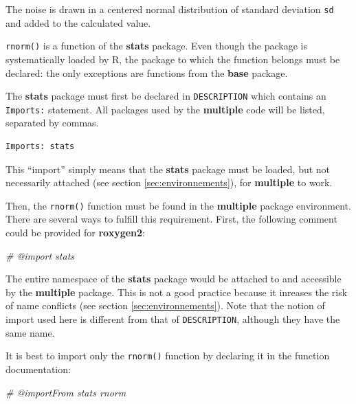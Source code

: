 \documentclass[
  12pt,
  american,
  a4paper,
  extrafontsizes,onecolumn,openright
  ]{memoir}
\newenvironment{Shaded}{\begin{snugshade}}{\end{snugshade}}
\newcommand{\CommentTok}[1]{\textcolor[rgb]{0.56,0.35,0.01}{\textit{#1}}}
\begin{document}
\normalsize
The noise is drawn in a centered normal distribution of standard deviation \texttt{sd} and added to the calculated value.

\texttt{rnorm()} is a function of the \textbf{stats} package.
Even though the package is systematically loaded by R, the package to which the function belongs must be declared: the only exceptions are functions from the \textbf{base} package.

The \textbf{stats} package must first be declared in \texttt{DESCRIPTION} which contains an \texttt{Imports:} statement.
All packages used by the \textbf{multiple} code will be listed, separated by commas.

\begin{verbatim}
Imports: stats
\end{verbatim}

This \enquote{import} simply means that the \textbf{stats} package must be loaded, but not necessarily attached (see section \ref{sec:environnements}), for \textbf{multiple} to work.

Then, the \texttt{rnorm()} function must be found in the \textbf{multiple} package environment.
There are several ways to fulfill this requirement.
First, the following comment could be provided for \textbf{roxygen2}:

\scriptsize

\begin{Shaded}
\begin{Highlighting}[]
\CommentTok{\#\textquotesingle{} @import stats}
\end{Highlighting}
\end{Shaded}

\normalsize

The entire namespace of the \textbf{stats} package would be attached to and accessible by the \textbf{multiple} package.
This is not a good practice because it inreases the risk of name conflicts (see section \ref{sec:environnements}).
Note that the notion of import used here is different from that of \texttt{DESCRIPTION}, although they have the same name.

It is best to import only the \texttt{rnorm()} function by declaring it in the function documentation:

\scriptsize

\begin{Shaded}
\begin{Highlighting}[]
\CommentTok{\#\textquotesingle{} @importFrom stats rnorm}
\end{Highlighting}
\end{Shaded}
\end{document}
